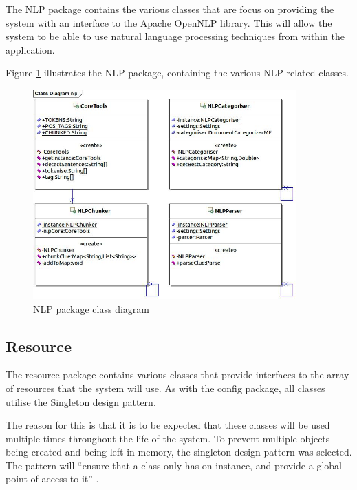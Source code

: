 The NLP package contains the various classes that are focus on providing the 
system with an interface to the Apache OpenNLP library. This will allow the 
system to be able to use natural language processing techniques from within the 
application.


Figure \ref{fig:nlp_package} illustrates the NLP package, containing the 
various NLP related classes.

\begin{figure}[H]
  \centering
  \includegraphics[width=0.9\textwidth]{design/class/nlp.jpg}
  \caption{NLP package class diagram}
  \label{fig:nlp_package}
\end{figure}


\subsection{Resource}
\label{sub:resource}

The resource package contains various classes that provide interfaces to the 
array of resources that the system will use. As with the config package, all 
classes utilise the Singleton design pattern. 

The reason for this is that it is to be expected that these classes will be used
multiple times throughout the life of the system. To prevent multiple objects 
being created and being left in memory, the singleton design pattern was 
selected. The pattern will ``ensure that a class only has on instance, and 
provide a global point of access to it'' \citep{gof}.

